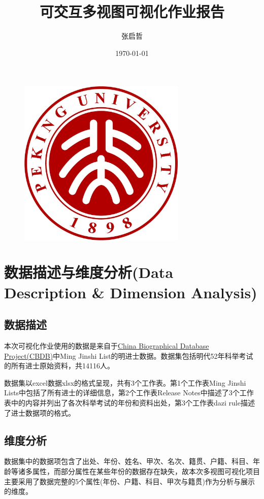 \documentclass[11pt]{article}
\title{\LARGE \bf 可交互多视图可视化作业报告}
\author{\LARGE 张启哲 \quad 1900011638}
\date{\Large \today}
\begin{document}
	\maketitle
	
	\begin{figure}[h]
		\centering
		\includegraphics[width=8cm]{../Figure/pku.jpg}
	\end{figure}
	
	\renewcommand{\contentsname}{目录(Contents)}
	\renewcommand{\algorithmicrequire}{\textbf{Input:}}
	\renewcommand{\algorithmicensure}{\textbf{Output:}}
	
	\tableofcontents
	
	\thispagestyle{empty}
	
	\newpage
	
	\setcounter{page}{1}
	
	\section{数据描述与维度分析(Data Description \& Dimension Analysis)}
	\subsection{数据描述}
	本次可视化作业使用的数据是来自于\href{https://projects.iq.harvard.edu/cbdb/data-sets}{China Biographical Database Project(CBDB)}中Ming Jinshi List的明进士数据。数据集包括明代52年科举考试的所有进士原始资料，共14116人。
	
	数据集以excel数据xlsx的格式呈现，共有3个工作表。第1个工作表Ming Jinshi Lists中包括了所有进士的详细信息，第2个工作表Release Notes中描述了3个工作表中的内容并列出了各次科举考试的年份和资料出处，第3个工作表dazi rule描述了进士数据项的格式。
	
	\subsection{维度分析}
	数据集中的数据项包含了出处、年份、姓名、甲次、名次、籍贯、户籍、科目、年龄等诸多属性，而部分属性在某些年份的数据存在缺失，故本次多视图可视化项目主要采用了数据完整的5个属性(年份、户籍、科目、甲次与籍贯)作为分析与展示的维度。
	
\end{document}
